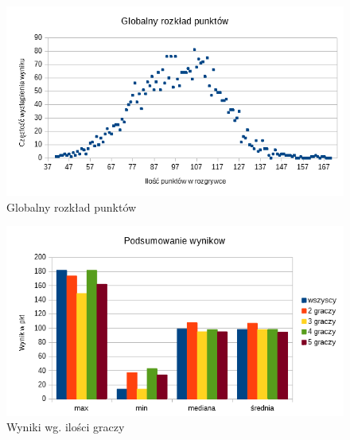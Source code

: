 \documentclass[12pt, oneside]{report}
\begin{document}
\begin{figure}
	\includegraphics{Wykrespunktowglobal.png}
	\caption{Globalny rozkład punktów}
	\label{figure:global_points_algo}
\end{figure}

\begin{figure}
	\includegraphics{WynikWPkt.png}
	\caption{Wyniki wg. ilości graczy}
	\label{figure:min_max_algo}
\end{figure}
\end{document}
